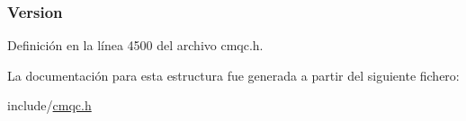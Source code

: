 \subsubsection[{Version}]{ Version}\label{structtag_m_q_m_d_e_a0656ef8f766b3907d394d88a35d7b7e9}


Definición en la línea 4500 del archivo cmqc.\+h.



La documentación para esta estructura fue generada a partir del siguiente fichero\+:\begin{DoxyCompactItemize}
\item 
include/\hyperlink{cmqc_8h}{cmqc.\+h}\end{DoxyCompactItemize}
